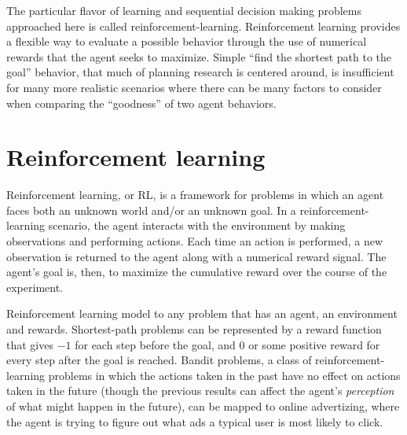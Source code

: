 
The particular flavor of learning and sequential decision making problems approached here is called reinforcement-learning. Reinforcement learning provides a flexible way to evaluate a possible behavior through the use of numerical rewards that the agent seeks to maximize. Simple ``find the shortest path to the goal'' behavior, that much of planning research is centered around, is insufficient for many more realistic scenarios where there can be many factors to consider when comparing the ``goodness'' of two agent behaviors.

\section{Reinforcement learning}

Reinforcement learning, or RL, is a framework for problems in which an agent faces both an unknown world and/or an unknown goal. In a reinforcement-learning scenario, the agent interacts with the environment by making observations and performing actions. Each time an action is performed, a new observation is returned to the agent along with a numerical reward signal. The agent's goal is, then, to maximize the cumulative reward over the course of the experiment.

Reinforcement learning model to any problem that has an agent, an environment and rewards. Shortest-path problems can be represented by a reward function that gives $-1$ for each step before the goal, and $0$ or some positive reward for every step after the goal is reached. Bandit problems, a class of reinforcement-learning problems in which the actions taken in the past have no effect on actions taken in the future (though the previous results can affect the agent's \emph{perception} of what might happen in the future), can be mapped to online advertizing, where the agent is trying to figure out what ads a typical user is most likely to click.

